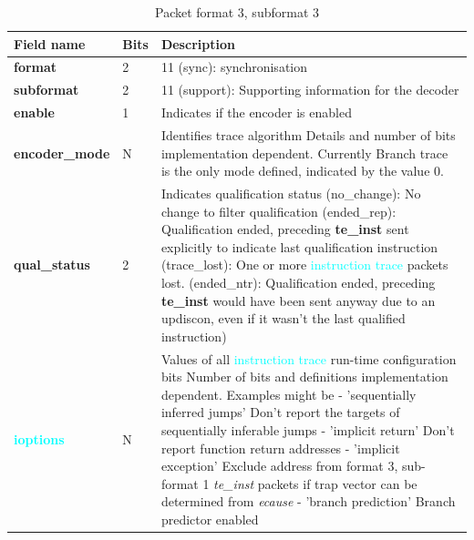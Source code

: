 \begin{table}[htp]
  \centering
  \caption{Packet format 3, subformat 3}
  \label{tab:te_inst3-3}
  \begin{tabulary}{\textwidth}{|l|p{35mm}|p{90mm}|}
    \hline
     {\bf Field name} & {\bf Bits} & {\bf Description} \\
     \hline
     \textbf{format} & 2 & 11 (sync): synchronisation\\
     \hline
     \textbf{subformat}  & 2 & 11 (support): Supporting information for the decoder \\
     \hline
     \textbf{enable} & 1 & Indicates if the encoder is enabled\\
     \hline
     \textbf{encoder\_mode} & N & Identifies trace algorithm\newline
       Details and number of bits implementation dependent.  Currently Branch trace is the only mode defined, indicated by the value 0.\\
     \hline
     \textbf{qual\_status} & 2 & Indicates qualification status (no\_change): No change to filter qualification  (ended\_rep): Qualification ended, preceding \textbf{te\_inst} sent explicitly to indicate last qualification instruction (trace\_lost): One or more \textcolor{cyan}{instruction trace} packets lost. (ended\_ntr): Qualification ended, preceding \textbf{te\_inst} would have been sent anyway due to an updiscon, even if it wasn't the last qualified instruction)\\
     \hline
     \textbf{\textcolor{cyan}{ioptions}} & N & Values of all \textcolor{cyan}{instruction trace} run-time configuration bits\newline
       Number of bits and definitions implementation dependent.  Examples might be\newline
       - 'sequentially inferred jumps' Don't report the targets of sequentially inferable jumps\newline
       - 'implicit return' Don't report function return addresses \newline
       - 'implicit exception' Exclude address from format 3, sub-format 1 \textit{te\_inst} packets if trap vector can be determined from \textit{ecause}\newline
       - 'branch prediction' Branch predictor enabled\newline

\end{tabulary}
\end{table}
